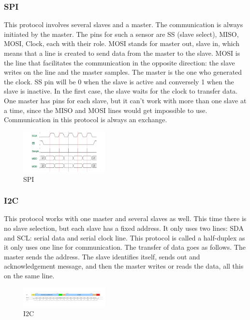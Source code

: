 \subsubsection{SPI}
This protocol involves several slaves and a master. The communication is always initiated by the master. The pins for such a sensor are SS (slave select), MISO, MOSI, Clock, each with their role.  MOSI stands for master out, slave in, which means that a line is created to send data from the master to the slave. MOSI is the line that facilitates the communication in the opposite direction: the slave writes on the line and the master samples. 
The master is the one who generated the clock. SS pin will be 0 when the slave is active and conversely 1 when the slave is inactive. In the first case, the slave waits for the clock to transfer data. One master has pins for each slave, but it can’t work with more than one slave at a time, since the MISO and MOSI lines would get impossible to use.  
Communication in this protocol is always an exchange. 

\begin{figure}[ht]
    \centering
    \includegraphics[width=0.4\textwidth]{figures/SPI.png}
    \caption{SPI}
\end{figure}

\subsubsection{I2C}
This protocol works with one master and several slaves as well. This time there is no slave selection, but each slave has a fixed address.  
It only uses two lines: SDA and SCL: serial data and serial clock line. This protocol is called a half-duplex as it only uses one line for communication. The transfer of data goes as follows. The master sends the address. The slave identifies itself, sends out and acknowledgement message, and then the master writes or reads the data, all this on the same line.  

\begin{figure}[ht]
    \centering
    \includegraphics[width=0.4\textwidth]{figures/I2C.png}
    \caption{I2C}
\end{figure}

